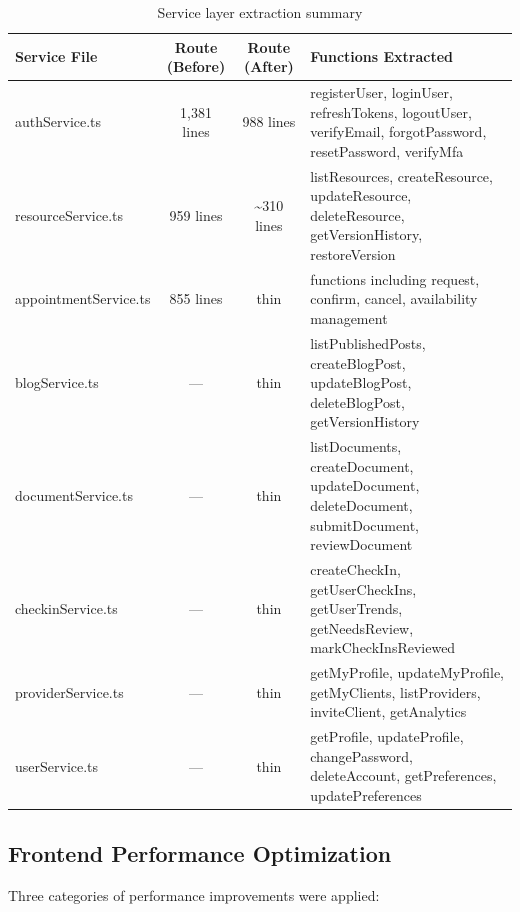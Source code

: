 \documentclass[12pt,letterpaper]{article}
\begin{document}
\begin{table}[!htbp]
\centering
\small
\begin{tabularx}{\textwidth}{|l|c|c|>{\raggedright\arraybackslash}X|}
\hline
\rowcolor{TableHeader}\textcolor{TableHeaderText}{\textbf{Service File}} & \textcolor{TableHeaderText}{\textbf{Route (Before)}} & \textcolor{TableHeaderText}{\textbf{Route (After)}} & \textcolor{TableHeaderText}{\textbf{Functions Extracted}} \\
\hline
authService.ts & 1,381 lines & 988 lines & registerUser, loginUser, refreshTokens, logoutUser, verifyEmail, forgotPassword, resetPassword, verifyMfa \\
\hline
\rowcolor{TableRowAlt}
resourceService.ts & 959 lines & \textasciitilde310 lines & listResources, createResource, updateResource, deleteResource, getVersionHistory, restoreVersion \\
\hline
appointmentService.ts & 855 lines & thin & 15 functions including request, confirm, cancel, availability management \\
\hline
\rowcolor{TableRowAlt}
blogService.ts & --- & thin & listPublishedPosts, createBlogPost, updateBlogPost, deleteBlogPost, getVersionHistory \\
\hline
documentService.ts & --- & thin & listDocuments, createDocument, updateDocument, deleteDocument, submitDocument, reviewDocument \\
\hline
\rowcolor{TableRowAlt}
checkinService.ts & --- & thin & createCheckIn, getUserCheckIns, getUserTrends, getNeedsReview, markCheckInsReviewed \\
\hline
providerService.ts & --- & thin & getMyProfile, updateMyProfile, getMyClients, listProviders, inviteClient, getAnalytics \\
\hline
\rowcolor{TableRowAlt}
userService.ts & --- & thin & getProfile, updateProfile, changePassword, deleteAccount, getPreferences, updatePreferences \\
\hline
\end{tabularx}
\caption{Service layer extraction summary}
\end{table}

\subsection{Frontend Performance Optimization}

Three categories of performance improvements were applied:
\end{document}
